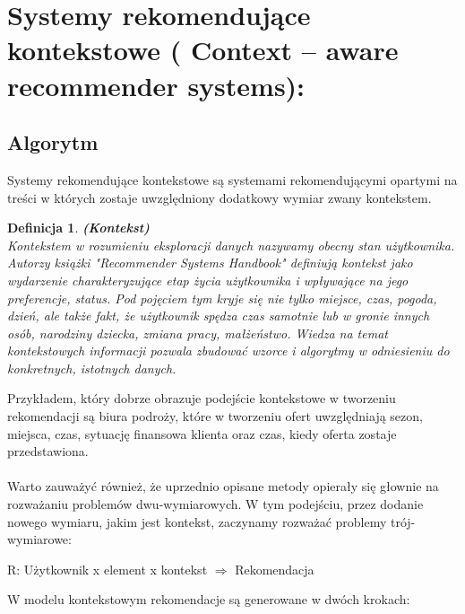 \documentclass[12pt,a4paper]{report}
\newtheorem{df}{Definicja}
\begin{document}
\section{Systemy rekomendujące kontekstowe ( Context – aware recommender systems):}

\subsection{Algorytm}
Systemy rekomendujące kontekstowe są systemami rekomendującymi opartymi na treści w których zostaje uwzględniony dodatkowy wymiar zwany kontekstem.

\begin{df}\textbf{(Kontekst)}
\\Kontekstem w rozumieniu eksploracji danych nazywamy obecny stan użytkownika. Autorzy książki "Recommender Systems Handbook" definiują kontekst jako wydarzenie charakteryzujące etap życia użytkownika i wpływające na jego preferencje, status. Pod pojęciem tym kryje się nie tylko miejsce, czas, pogoda, dzień, ale także fakt, że użytkownik spędza czas samotnie lub w gronie innych osób, narodziny dziecka, zmiana pracy, małżeństwo. Wiedza na temat kontekstowych informacji pozwala zbudować wzorce i algorytmy w odniesieniu do konkretnych, istotnych danych.
\end{df}
Przykładem, który dobrze obrazuje podejście kontekstowe w tworzeniu rekomendacji są biura podroży, które w tworzeniu ofert uwzględniają sezon, miejsca, czas, sytuację finansowa klienta oraz czas, kiedy oferta zostaje przedstawiona. 
\\
\\Warto zauważyć również, że uprzednio opisane metody opierały się głownie na rozważaniu problemów dwu-wymiarowych. W tym podejściu, przez dodanie nowego wymiaru, jakim jest kontekst, zaczynamy rozważać problemy trój-wymiarowe:
\begin{center}
R: Użytkownik x element x kontekst $ \Rightarrow$ Rekomendacja
\end{center}
W modelu kontekstowym rekomendacje są generowane w dwóch krokach:
\end{document}
